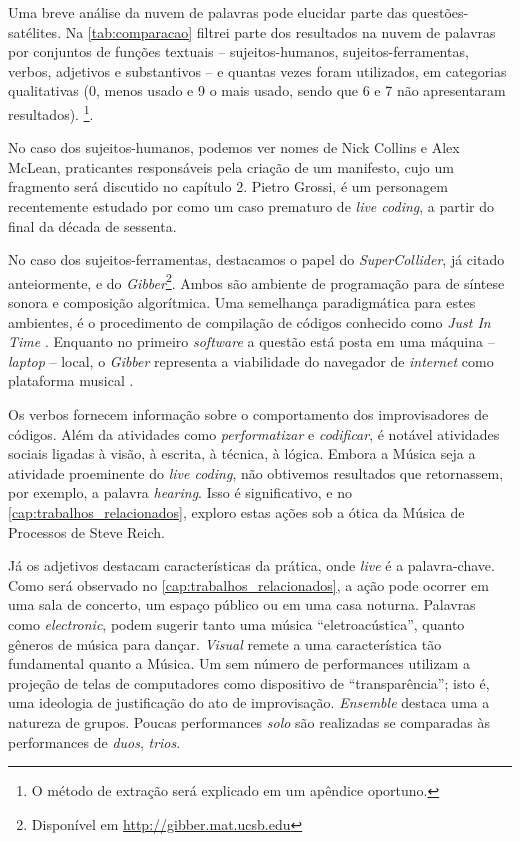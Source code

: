 Uma breve análise da nuvem de palavras pode elucidar parte das questões-satélites. Na \autoref{tab:comparacao} filtrei parte dos resultados na nuvem de palavras por conjuntos de funções textuais -- sujeitos-humanos, sujeitos-ferramentas, verbos, adjetivos e substantivos -- e quantas vezes foram utilizados, em categorias qualitativas (0, menos usado e 9 o mais usado, sendo que 6 e 7 não apresentaram resultados). \footnote{O método de extração será explicado em um apêndice oportuno.}. 

No caso dos sujeitos-humanos, podemos ver nomes de Nick Collins e Alex McLean, praticantes responsáveis pela criação de um manifesto, cujo um fragmento será discutido no capítulo 2. Pietro Grossi, é um personagem recentemente estudado por  como um caso prematuro de \emph{live coding}, a partir do final da década de sessenta.

No caso dos sujeitos-ferramentas, destacamos o papel do \emph{SuperCollider}, já citado anteiormente, e do \emph{Gibber}\footnote{Disponível em \url{http://gibber.mat.ucsb.edu}}. Ambos são ambiente de programação para de síntese sonora e composição algorítmica. Uma semelhança paradigmática para estes ambientes, é o procedimento de compilação de códigos conhecido como \emph{Just In Time} \cite{aycock_brief_2003}. Enquanto no primeiro \emph{software} a questão está posta em uma máquina -- \emph{laptop} -- local, o \emph{Gibber} representa a viabilidade do navegador de \emph{internet} como plataforma musical .

Os verbos fornecem informação sobre o comportamento dos improvisadores de códigos. Além da atividades como \emph{performatizar} e \emph{codificar}, é notável atividades sociais ligadas à visão, à escrita, à técnica, à lógica. Embora a Música seja a atividade proeminente do \emph{live coding}, não obtivemos resultados que retornassem, por exemplo, a palavra \emph{hearing}. Isso é significativo, e no \autoref{cap:trabalhos_relacionados}, exploro estas ações sob a ótica da Música de Processos de Steve Reich.

Já os adjetivos destacam características da prática, onde \emph{live} é a palavra-chave. Como será observado no \autoref{cap:trabalhos_relacionados}, a ação pode ocorrer em uma sala de concerto, um espaço público ou em uma casa noturna. Palavras como  \emph{electronic}, podem sugerir tanto uma música ``eletroacústica'', quanto gêneros de música para dançar. \emph{Visual} remete a uma característica tão fundamental quanto a Música. Um sem número de performances utilizam a projeção de telas de computadores como dispositivo de ``transparência''; isto é, uma ideologia de justificação do ato de improvisação. \emph{Ensemble} destaca uma a natureza de grupos. Poucas performances \emph{solo} são realizadas se comparadas às performances de \emph{duos}, \emph{trios}. 


